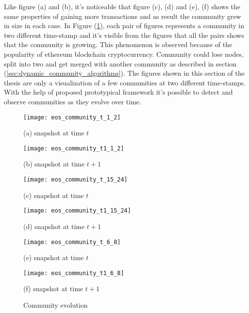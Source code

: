 Like figure (a) and (b), it's noticeable that figure (c), (d) and (e), (f) shows the same properties of gaining more transactions and as result the community grew in size in each case. In Figure (\ref{fig:community_evolution_evaluation}), each pair of figures represents a community in two different time-stamp and it's visible from the figures that all the pairs shows that the community is growing. This phenomenon is observed because of the popularity of ethereum blockchain cryptocurrency. Community could lose nodes, split into two and get merged with another community as described in section (\ref{sec:dynamic_community_algorithms}). The figures shown in this section of the thesis are only a visualization of a few communities at two different time-stamps. With the help of proposed prototypical framework it's possible to detect and observe communities as they evolve over time.

\begin{figure}[H]
  \centering
  \begin{minipage}[b]{0.4\textwidth}
    \texttt{[image: eos\_community\_t\_1\_2]}
    \caption*{(a) snapshot at time $t$}
  \end{minipage}
  \begin{minipage}[b]{0.4\textwidth}
    \texttt{[image: eos\_community\_t1\_1\_2]}
    \caption*{(b) snapshot at time $t+1$}
  \end{minipage}
  \begin{minipage}[b]{0.4\textwidth}
    \texttt{[image: eos\_community\_t\_15\_24]}
    \caption*{(c) snapshot at time $t$}
  \end{minipage}
  \begin{minipage}[b]{0.4\textwidth}
    \texttt{[image: eos\_community\_t1\_15\_24]}
    \caption*{(d) snapshot at time $t+1$}
  \end{minipage}
  \begin{minipage}[b]{0.4\textwidth}
    \texttt{[image: eos\_community\_t\_6\_8]}
    \caption*{(e) snapshot at time $t$}
  \end{minipage}
  \begin{minipage}[b]{0.4\textwidth}
    \texttt{[image: eos\_community\_t1\_6\_8]}
    \caption*{(f) snapshot at time $t+1$}
  \end{minipage}
  \caption{Community evolution}
  \label{fig:community_evolution_evaluation}
\end{figure}
